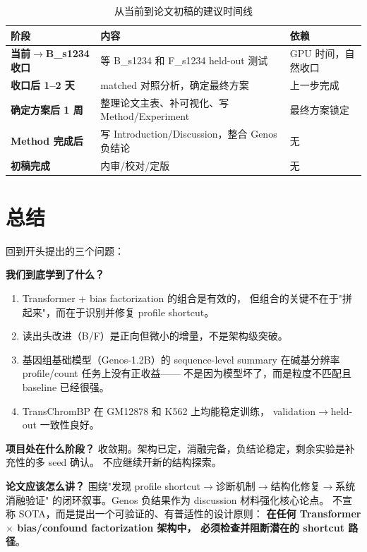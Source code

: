 \documentclass[11pt,a4paper]{ctexart}
\begin{document}
\begin{table}[H]
\centering
\small
\caption{从当前到论文初稿的建议时间线}
\begin{tabular}{lll}
\toprule
阶段 & 内容 & 依赖 \\
\midrule
\textbf{当前$\to$B\_s1234 收口} &
  等 B\_s1234 和 F\_s1234 held-out 测试 &
  GPU 时间，自然收口 \\
\textbf{收口后 1--2 天} &
  matched 对照分析，确定最终方案 &
  上一步完成 \\
\textbf{确定方案后 1 周} &
  整理论文主表、补可视化、写 Method/Experiment &
  最终方案锁定 \\
\textbf{Method 完成后} &
  写 Introduction/Discussion，整合 Genos 负结论 &
  无 \\
\textbf{初稿完成} &
  内审/校对/定版 &
  无 \\
\bottomrule
\end{tabular}
\end{table}

\section{总结}
\label{sec:conclusion}

回到开头提出的三个问题：

\textbf{我们到底学到了什么？}
\begin{enumerate}[leftmargin=2em]
  \item Transformer + bias factorization 的组合是有效的，
    但组合的关键不在于"拼起来"，而在于识别并修复 profile shortcut。
  \item 读出头改进（B/F）是正向但微小的增量，不是架构级突破。
  \item 基因组基础模型（Genos-1.2B）的 sequence-level summary
    在碱基分辨率 profile/count 任务上没有正收益——
    不是因为模型坏了，而是粒度不匹配且 baseline 已经很强。
  \item TransChromBP 在 GM12878 和 K562 上均能稳定训练，
    validation$\to$held-out 一致性良好。
\end{enumerate}

\textbf{项目处在什么阶段？}
收敛期。架构已定，消融完备，负结论稳定，剩余实验是补充性的多 seed 确认。
不应继续开新的结构探索。

\textbf{论文应该怎么讲？}
围绕"发现 profile shortcut$\to$诊断机制$\to$结构化修复$\to$系统消融验证"
的闭环叙事。Genos 负结果作为 discussion 材料强化核心论点。
不宣称 SOTA，而是提出一个可验证的、有普适性的设计原则：
\textbf{在任何 Transformer $\times$ bias/confound factorization 架构中，
必须检查并阻断潜在的 shortcut 路径}。
\end{document}
